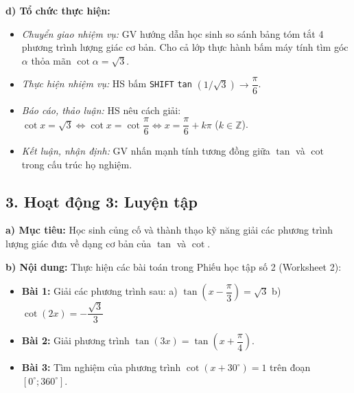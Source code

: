 \documentclass[12pt, a4paper]{article}
\begin{document}
\noindent \textbf{d) Tổ chức thực hiện:}  
\begin{itemize}[leftmargin=0.8cm]  
    \item \textit{Chuyển giao nhiệm vụ:} GV hướng dẫn học sinh so sánh bảng tóm tắt 4 phương trình lượng giác cơ bản. Cho cả lớp thực hành bấm máy tính tìm góc $\alpha$ thỏa mãn $\cot\alpha = \sqrt{3}$.  
    \item \textit{Thực hiện nhiệm vụ:} HS bấm \texttt{SHIFT} \texttt{tan} $(1/\sqrt{3}) \to \dfrac{\pi}{6}$.  
    \item \textit{Báo cáo, thảo luận:} HS nêu cách giải: $\cot x = \sqrt{3} \iff \cot x = \cot\dfrac{\pi}{6} \iff x = \dfrac{\pi}{6} + k\pi$ ($k \in \mathbb{Z}$).  
    \item \textit{Kết luận, nhận định:} GV nhấn mạnh tính tương đồng giữa $\tan$ và $\cot$ trong cấu trúc họ nghiệm.  
\end{itemize}  
  
\subsection*{3. Hoạt động 3: Luyện tập}  
  
\noindent \textbf{a) Mục tiêu:}  
Học sinh củng cố và thành thạo kỹ năng giải các phương trình lượng giác đưa về dạng cơ bản của $\tan$ và $\cot$.  
  
\noindent \textbf{b) Nội dung:}  
Thực hiện các bài toán trong Phiếu học tập số 2 (Worksheet 2):  
\begin{itemize}[leftmargin=0.6cm]  
    \item \textbf{Bài 1:} Giải các phương trình sau:  
    a) $\tan\left(x - \dfrac{\pi}{3}\right) = \sqrt{3}$ \qquad b) $\cot(2x) = -\dfrac{\sqrt{3}}{3}$  
    \item \textbf{Bài 2:} Giải phương trình $\tan(3x) = \tan\left(x + \dfrac{\pi}{4}\right)$.  
    \item \textbf{Bài 3:} Tìm nghiệm của phương trình $\cot\left(x + 30^\circ\right) = 1$ trên đoạn $[0^\circ; 360^\circ]$.  
\end{itemize}  
  
\end{document}
